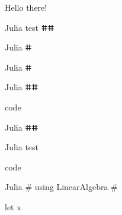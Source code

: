 \documentclass[11pt, titlepage, a4paper, oneside]{book}
\begin{document}
\begin{theorem}
    Hello there!
\end{theorem}

\newlength{\mylength}
\the\mylength
\begin{code}[autowidth = upper]{Julia}
    test ⵌ\hspace{\textwidthoutside}ⵌ
\end{code}
\begin{code*}{Julia}
    ⵌ\the{}
\end{code*}
\the\textwidth

\begin{minipage}{0.5\textwidth}
    \begin{code}{Julia}
    ⵌ\the{}
    \end{code}
    \begin{code}[autowidth = upper]{Julia}
    ⵌ\hspace{175.18944pt}ⵌ
    \end{code}
    code

    \begin{code}[autowidth = upper]{Julia}
    ⵌ\hspace{175.18945pt}ⵌ
    \end{code}

    \begin{code}[autowidth = upper]{Julia}
    test
    \end{code}

    \the\textwidth
\end{minipage}

code

\def\myfileext{undefined}

\begin{code}{Julia}
    # using LinearAlgebra #

    let x
\end{code}
\end{document}
